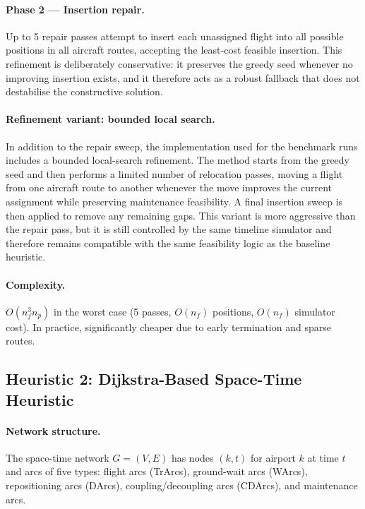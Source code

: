 \paragraph{Phase 2 — Insertion repair.}
Up to 5 repair passes attempt to insert each unassigned flight into all
possible positions in all aircraft routes, accepting the least-cost feasible
insertion.  This refinement is deliberately conservative: it preserves the
greedy seed whenever no improving insertion exists, and it therefore acts as
a robust fallback that does not destabilise the constructive solution.

\paragraph{Refinement variant: bounded local search.}
In addition to the repair sweep, the implementation used for the benchmark
runs includes a bounded local-search refinement.  The method starts from the
greedy seed and then performs a limited number of relocation passes, moving a
flight from one aircraft route to another whenever the move improves the
current assignment while preserving maintenance feasibility.  A final
insertion sweep is then applied to remove any remaining gaps.  This variant is
more aggressive than the repair pass, but it is still controlled by the same
timeline simulator and therefore remains compatible with the same feasibility
logic as the baseline heuristic.

\paragraph{Complexity.}
$O(n_f^3 n_p)$ in the worst case (5 passes, $O(n_f)$ positions, $O(n_f)$
simulator cost).  In practice, significantly cheaper due to early termination
and sparse routes.

\subsection{Heuristic 2: Dijkstra-Based Space-Time Heuristic}

\paragraph{Network structure.}
The space-time network $G = (V, E)$ has nodes $(k, t)$ for airport $k$ at
time $t$ and arcs of five types: flight arcs (TrArcs), ground-wait arcs
(WArcs), repositioning arcs (DArcs), coupling/decoupling arcs (CDArcs), and
maintenance arcs.

